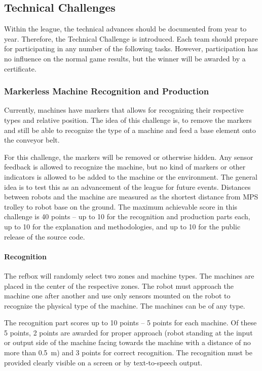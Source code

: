 \documentclass[12pt,twoside]{article}
\begin{document}
\subsection{Technical Challenges}
\label{sec:technical-challenge}
Within the league, the technical advances should be documented from
year to year. Therefore, the Technical Challenge is introduced. Each
team should prepare for participating in any number of the following
tasks. However, participation has no influence on the normal game
results, but the winner will be awarded by a certificate.


\subsubsection{Markerless Machine Recognition and Production}
Currently, machines have markers that allows for recognizing their
respective types and relative position. The idea of this challenge is,
to remove the markers and still be able to recognize the type of a
machine and feed a base element onto the conveyor belt.

For this challenge, the markers will be removed or otherwise
hidden. Any sensor feedback is allowed to recognize the machine, but
no kind of markers or other indicators is allowed to be added to the
machine or the environment. The general idea is to test this as an
advancement of the league for future events. Distances between robots
and the machine are measured as the shortest distance from MPS trolley
to robot base on the ground. The maximum achievable score in this
challenge is 40 points -- up to 10 for the recognition and production
parts each, up to 10 for the explanation and methodologies, and up to
10 for the public release of the source code.

\vspace{-2ex}\paragraph{Recognition}
The refbox will randomly select two zones and machine types. The
machines are placed in the center of the respective zones. The robot
must approach the machine one after another and use only sensors
mounted on the robot to recognize the physical type of the
machine. The machines can be of any type.

The recognition part scores up to 10 points -- 5 points for each
machine. Of these 5 points, 2 points are awarded for proper approach
(robot standing at the input or output side of the machine facing
towards the machine with a distance of no more than \SI{0.5}{\metre})
and 3 points for correct recognition. The recognition must be provided
clearly visible on a screen or by text-to-speech output.
\end{document}
